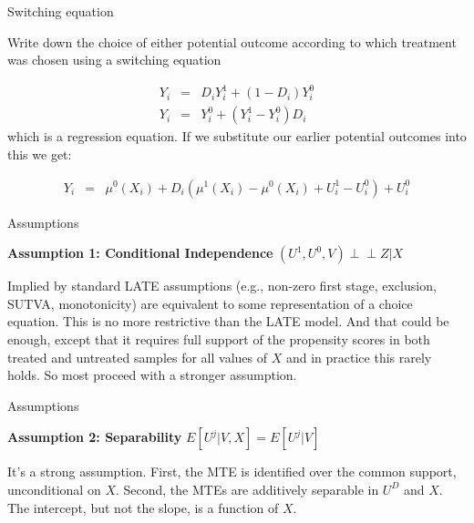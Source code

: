 \documentclass{beamer}
\begin{document}
\begin{frame}{Switching equation}

Write down the choice of either potential outcome according to which treatment was chosen using a switching equation

\begin{eqnarray*}
Y_i &=& D_iY_i^1 + (1-D_i)Y_i^0 \\
Y_i &=& Y_i^0 + (Y_i^1 - Y_i^0)D_i
\end{eqnarray*}which is a regression equation.  If we substitute our earlier potential outcomes into this we get:

\begin{eqnarray*}
Y_i &=& \mu^0(X_i) + D_i(\mu^1(X_i) - \mu^0(X_i) + U_i^1 - U_i^0) + U_i^0
\end{eqnarray*}

\end{frame}

\begin{frame}{Assumptions}

\begin{block}{\textbf{Assumption 1: Conditional Independence}}
$(U^1,U^0,V) \perp\!\!\!\perp Z | X$

\bigskip

Implied by standard LATE assumptions (e.g., non-zero first stage, exclusion, SUTVA, monotonicity) are equivalent to some representation of a choice equation.  This is no more restrictive than the LATE model. And that could be enough, except that it requires full support of the propensity scores in both treated and untreated samples for all values of $X$ and in practice this rarely holds. So most proceed with a stronger assumption.

\end{block}

\end{frame}


\begin{frame}{Assumptions}

\begin{block}{\textbf{Assumption 2: Separability}}
$E[U^j|V,X] = E[U^j|V]$

\bigskip

It's a strong assumption.  First, the MTE is identified over the common support, unconditional on $X$.  Second, the MTEs are additively separable in $U^D$ and $X$. The intercept, but not the slope, is a function of $X$. 


\end{block}

\end{frame}
\end{document}
